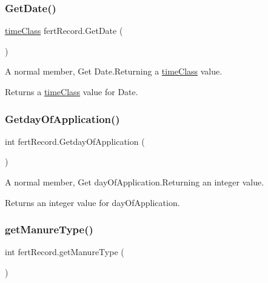 \subsubsection{\texorpdfstring{GetDate()}{GetDate()}}
{\footnotesize\ttfamily \mbox{\hyperlink{classtime_class}{time\+Class}} fert\+Record.\+Get\+Date (\begin{DoxyParamCaption}{ }\end{DoxyParamCaption})\hspace{0.3cm}{\ttfamily [inline]}}



A normal member, Get Date.\+Returning a \mbox{\hyperlink{classtime_class}{time\+Class}} value. 

\begin{DoxyReturn}{Returns}
a \mbox{\hyperlink{classtime_class}{time\+Class}} value for Date. 
\end{DoxyReturn}
\mbox{\label{classfert_record_a2fbd7cc091c52650dbd0f96619a1dcbe}} 
\subsubsection{\texorpdfstring{GetdayOfApplication()}{GetdayOfApplication()}}
{\footnotesize\ttfamily int fert\+Record.\+Getday\+Of\+Application (\begin{DoxyParamCaption}{ }\end{DoxyParamCaption})\hspace{0.3cm}{\ttfamily [inline]}}



A normal member, Get day\+Of\+Application.\+Returning an integer value. 

\begin{DoxyReturn}{Returns}
an integer value for day\+Of\+Application. 
\end{DoxyReturn}
\mbox{\label{classfert_record_ab027ab1cd0e3579155e2457a1ba14e85}} 
\subsubsection{\texorpdfstring{getManureType()}{getManureType()}}
{\footnotesize\ttfamily int fert\+Record.\+get\+Manure\+Type (\begin{DoxyParamCaption}{ }\end{DoxyParamCaption})\hspace{0.3cm}{\ttfamily [inline]}}



